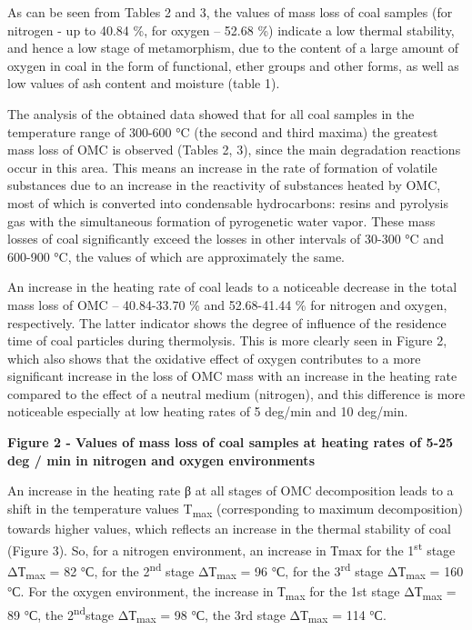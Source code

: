 As can be seen from Tables 2 and 3, the values of mass loss of coal
samples (for nitrogen - up to 40.84 \%, for oxygen -- 52.68 \%) indicate
a low thermal stability, and hence a low stage of metamorphism, due to
the content of a large amount of oxygen in coal in the form of
functional, ether groups and other forms, as well as low values of ash
content and moisture (table 1).

The analysis of the obtained data showed that for all coal samples in
the temperature range of 300-600 °C (the second and third maxima) the
greatest mass loss of OMC is observed (Tables 2, 3), since the main
degradation reactions occur in this area. This means an increase in the
rate of formation of volatile substances due to an increase in the
reactivity of substances heated by OMC, most of which is converted into
condensable hydrocarbons: resins and pyrolysis gas with the simultaneous
formation of pyrogenetic water vapor. These mass losses of coal
significantly exceed the losses in other intervals of 30-300 °C and
600-900 °C, the values of which are approximately the same.

An increase in the heating rate of coal leads to a noticeable decrease
in the total mass loss of OMC -- 40.84-33.70 \% and 52.68-41.44 \% for
nitrogen and oxygen, respectively. The latter indicator shows the degree
of influence of the residence time of coal particles during thermolysis.
This is more clearly seen in Figure 2, which also shows that the
oxidative effect of oxygen contributes to a more significant increase in
the loss of OMC mass with an increase in the heating rate compared to
the effect of a neutral medium (nitrogen), and this difference is more
noticeable especially at low heating rates of 5 deg/min and 10 deg/min.

\textbf{Figure 2 - Values of mass loss of coal samples at heating rates
of 5-25 deg / min in nitrogen and oxygen environments}

An increase in the heating rate β at all stages of OMC decomposition
leads to a shift in the temperature values T\textsubscript{max}
(corresponding to maximum decomposition) towards higher values, which
reflects an increase in the thermal stability of coal (Figure 3). So,
for a nitrogen environment, an increase in Тmax for the
1\textsuperscript{st} stage ΔТ\textsubscript{max} = 82 °С, for the
2\textsuperscript{nd} stage ΔТ\textsubscript{max} = 96 °С, for the
3\textsuperscript{rd} stage ΔТ\textsubscript{max} = 160 °С. For the
oxygen environment, the increase in Т\textsubscript{max} for the 1st
stage ΔТ\textsubscript{max} = 89 °С, the 2\textsuperscript{nd}stage
ΔТ\textsubscript{max} = 98 °С, the 3rd stage ΔТ\textsubscript{max} = 114
°С.

